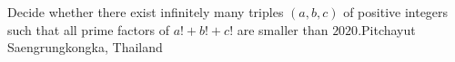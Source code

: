 Decide whether there exist infinitely many triples $(a,b,c)$ of positive integers such that all prime factors of $a!+b!+c!$ are smaller than $2020$.Pitchayut Saengrungkongka, Thailand